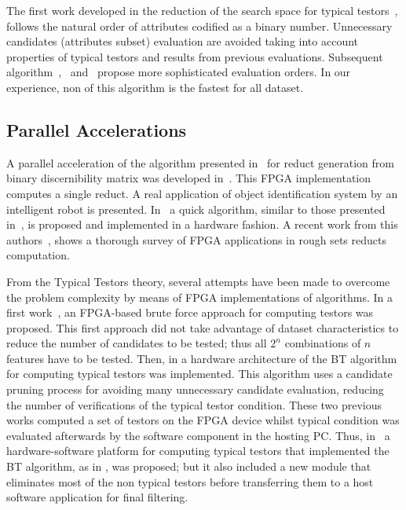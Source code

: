 \documentclass[11pt]{article}   %
\begin{document}
  The first work developed in the reduction of the search space for typical testors~\cite{Ruiz85}, follows 
  the natural order of attributes codified as a binary number. Unnecessary candidates (attributes subset)
  evaluation are avoided taking into account properties of typical testors and results from previous 
  evaluations. Subsequent algorithm~\cite{Santiesteban03},~\cite{Sanchez07} and~\cite{Lias09} propose
  more sophisticated evaluation orders. In our experience, non of this algorithm is the fastest for all dataset.
  
\subsection{Parallel Accelerations}

  A parallel acceleration of the algorithm presented in~\cite{Yang08} for reduct generation from binary
  discernibility matrix was developed in~\cite{Tiwari11,Tiwari12}. This FPGA implementation computes a 
  single reduct. A real application of object identification system by an intelligent robot is presented.
  In~\cite{Tiwari13} a quick algorithm, similar to those presented in~\cite{Chouchoulas01}, is proposed
  and implemented in a hardware fashion. A recent work from this authors~\cite{Tiwari14}, shows a thorough
  survey of FPGA applications in rough sets reducts computation.

  From the Typical Testors theory, several attempts have been made to overcome the problem 
  complexity by means of FPGA implementations of algorithms. In a first work~\cite{Cumplido06}, an 
  FPGA-based brute force approach for computing testors was proposed. This first approach did 
  not take advantage of dataset characteristics to reduce the number of candidates to be tested; 
  thus all $2^n$ combinations of $n$ features have to be tested. Then, in \cite{Rojas07} a hardware 
  architecture of the BT algorithm for computing typical testors was implemented. 
  This algorithm uses a candidate pruning process for avoiding many unnecessary candidate evaluation, 
  reducing the number of verifications of the typical testor condition. These two previous works computed 
  a set of testors on the FPGA device whilst typical condition was evaluated afterwards by the 
  software component in the hosting PC. Thus, in~\cite{Rojas12} a hardware-software platform for 
  computing typical testors that implemented the BT algorithm, as in \cite{Rojas07}, was proposed; but it also 
  included a new module that eliminates most of the non typical testors before transferring them to 
  a host software application for final filtering. 
\end{document}
